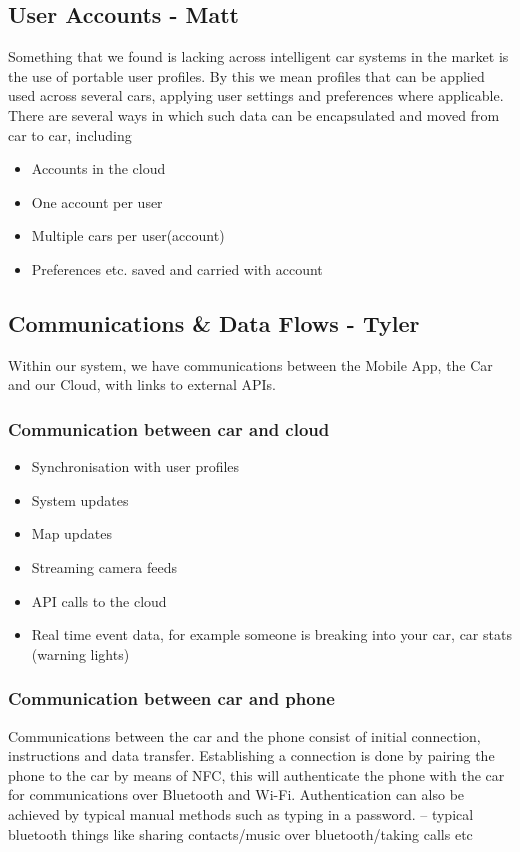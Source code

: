 \documentclass{article}
\begin{document}
\subsection{User Accounts - Matt}\label{ssec:user-accounts} 
Something that we found is lacking across intelligent car systems in the market is the use of portable user profiles. By this we mean profiles that can be applied used across several cars, applying user settings and preferences where applicable. 
There are several ways in which such data can be encapsulated and moved from car to car, including 
\begin{itemize}
  \item Accounts in the cloud
  \item One account per user
  \item Multiple cars per user(account)
  \item Preferences etc. saved and carried with account 
\end{itemize}

\subsection{Communications \& Data Flows - Tyler}\label{ssec:communications-data}
Within our system, we have communications between the Mobile App, the Car and our Cloud, with links to external APIs.

\subsubsection{Communication between car and cloud}
\begin{itemize}
  \item Synchronisation with user profiles
  \item System updates
  \item Map updates
  \item Streaming camera feeds
  \item API calls to the cloud
  \item Real time event data, for example someone is breaking into your car, car stats (warning lights)
\end{itemize}
\subsubsection{Communication between car and phone}
Communications between the car and the phone consist of initial connection, instructions and data transfer. Establishing a connection is done by pairing the phone to the car by means of NFC, this will authenticate the phone with the car for communications over Bluetooth and Wi-Fi. Authentication can also be achieved by typical manual methods such as typing in a password. 
-- typical bluetooth things like sharing contacts/music over bluetooth/taking calls etc
\end{document}
